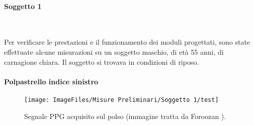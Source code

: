 \paragraph{Soggetto 1}~

Per verificare le prestazioni e il funzionamento dei moduli progettati, sono state effettuate alcune misurazioni su un soggetto maschio, di età 55 anni, di carnagione chiara. Il soggetto si trovava in condizioni di riposo.

\paragraph{Polpastrello indice sinistro}
\begin{figure}[tbh]
	\centering
	\texttt{[image: ImageFiles/Misure Preliminari/Soggetto 1/test]}
	\caption{Segnale PPG acquisito sul polso (immagine tratta da Foroozan \cite{Foroozan2018}).}
	\label{fig:Descrizione_Segnale_PPG}
\end{figure}
\clearpage
